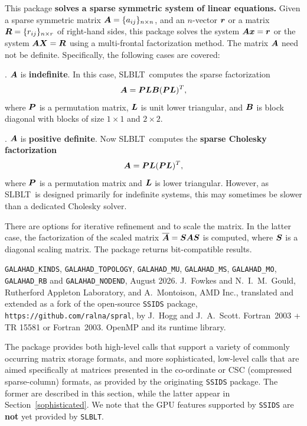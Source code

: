 \documentclass{galahad}
\newcommand{\packagename}{SLBLT}
\begin{document}
\galheader


\galsummary

This package 
{\bf solves a sparse symmetric system of linear equations.} Given 
a sparse symmetric matrix ${\bm{A}} = \{ a_{ij} \}_{n \times n}$, and an 
$n$-vector ${\bm{r}}$ or a matrix ${\bm{R}} = \{ r_{ij} \}_{n \times r}$
of right-hand sides, this package
solves the system ${\bm{A}} {\bm{x}} = {\bm{r}}$ or the system 
${\bm{A}} {\bm{X}} = {\bm{R}}$  using a multi-frontal factorization method.
The matrix ${\bm{A}}$ need not be definite. Specifically,
the following cases are covered:

. ${\bm{A}}$ is {\bf indefinite}.
In this case, \packagename\ computes the sparse factorization
\[
{\bm{A}} =  {\bm{P}}{\bm{L}}{\bm{B}}({\bm{P}}{\bm{L}})^T,
\]
where ${\bm{P}}$ is a permutation matrix, ${\bm{L}}$ is unit lower triangular,
and ${\bm{B}}$ is block diagonal with blocks of size $1 \times 1$
and $2 \times 2$.

. ${\bm{A}}$ is {\bf positive definite}.
Now \packagename\ computes the {\bf sparse Cholesky factorization}
\[
{\bm{A}} =  {\bm{P}}{\bm{L}}({\bm{P}}{\bm{L}})^T,
\]
where ${\bm{P}}$ is a permutation matrix and ${\bm{L}}$ is lower triangular.
However, as \packagename\ is designed primarily for indefinite
systems, this may sometimes be slower than a dedicated Cholesky solver.

\noindent
There are options for iterative refinement and to
scale the matrix. In the latter case, the factorization of
the scaled matrix  $\overline{{\bm{A}}} = {\bm{S}} {\bm{A}} {\bm{S}}$ is computed,
where ${\bm{S}}$ is a diagonal scaling matrix.
The package returns bit-compatible results.


\galattributes
\galuses
{\tt GALAHAD\_KINDS},
{\tt GALAHAD\_TOPOLOGY},
{\tt GALAHAD\_MU},
{\tt GALAHAD\_MS},
{\tt GALAHAD\_MO},
{\tt GALAHAD\_RB} and
{\tt GALAHAD\_NODEND},
\galdate August 2026.
\galorigin J.\ Fowkes and N.\ I.\ M.\ Gould,
Rutherford Appleton Laboratory, and A.\ Montoison, AMD Inc., 
translated and extended as a fork of the open-source {\tt SSIDS} 
package, {\tt https://github.\-com/ralna/spral},
by J.\ Hogg and J.\ A.\ Scott.
\gallanguage Fortran~2003 + TR 15581 or Fortran~2003.
\galparallelism OpenMP and its runtime library.


\galhowto

The package provides both high-level calls that support a variety of
commonly occurring matrix storage formats, and more sophisticated, low-level 
calls that are aimed specifically at matrices presented in the co-ordinate 
or CSC (compressed sparse-column) formats, as provided by the originating 
{\tt SSIDS}  package. The former are described in this section,
while the latter appear in Section~\ref{sophisticated}.
We note that the GPU features supported by {\tt SSIDS} are {\bf not}
yet provided by {\tt \packagename}.
\end{document}
